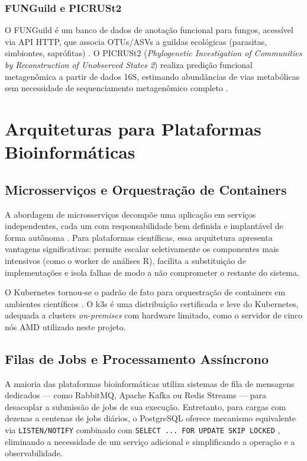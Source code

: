 \subsubsection{FUNGuild e PICRUSt2}

O FUNGuild é um banco de dados de anotação funcional para fungos,
acessível via API HTTP, que associa OTUs/ASVs a guildas ecológicas
(parasitas, simbiontes, saprófitas) \cite{nguyen2016funguild}. O
PICRUSt2 (\textit{Phylogenetic Investigation of Communities by
Reconstruction of Unobserved States 2}) realiza predição funcional
metagenômica a partir de dados 16S, estimando abundâncias de vias
metabólicas sem necessidade de sequenciamento metagenômico completo
\cite{douglas2020picrust2}.

\section{Arquiteturas para Plataformas Bioinformáticas}

\subsection{Microsserviços e Orquestração de Containers}

A abordagem de microsserviços decompõe uma aplicação em serviços
independentes, cada um com responsabilidade bem definida e
implantável de forma autônoma \cite{fowler2014microservices}. Para
plataformas científicas, essa arquitetura apresenta vantagens
significativas: permite escalar seletivamente os componentes mais
intensivos (como o worker de análises R), facilita a substituição de
implementações e isola falhas de modo a não comprometer o restante do
sistema.

O Kubernetes tornou-se o padrão de fato para orquestração de
containers em ambientes científicos \cite{kubernetes2022}. O k3s é
uma distribuição certificada e leve do Kubernetes, adequada a clusters
\textit{on-premises} com hardware limitado, como o servidor de cinco
nós AMD utilizado neste projeto.

\subsection{Filas de Jobs e Processamento Assíncrono}

A maioria das plataformas bioinformáticas utiliza sistemas de fila de
mensagens dedicados — como RabbitMQ, Apache Kafka ou Redis Streams —
para desacoplar a submissão de jobs de sua execução. Entretanto,
para cargas com dezenas a centenas de jobs diários, o PostgreSQL
oferece mecanismo equivalente via \texttt{LISTEN/NOTIFY} combinado
com \texttt{SELECT ... FOR UPDATE SKIP LOCKED}
\cite{brandl2021postgresql}, eliminando a necessidade de um serviço
adicional e simplificando a operação e a observabilidade.

